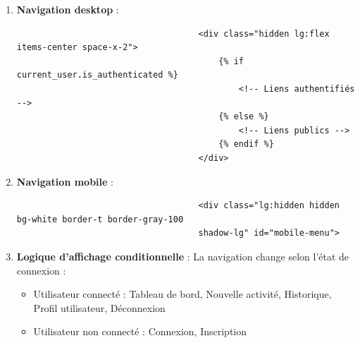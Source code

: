 \documentclass[a4paper,11pt]{article}
\begin{document}
                    \begin{enumerate}
                        \item \textbf{Navigation desktop} :
                            \begin{tcolorbox}[colback=lightgray!6, colframe=black, left=-45mm, right=5mm, top=2mm, bottom=0mm, boxrule=0.1mm]
                                \begin{verbatim}
                                    <div class="hidden lg:flex items-center space-x-2">
                                        {% if current_user.is_authenticated %}
                                            <!-- Liens authentifiés -->
                                        {% else %}
                                            <!-- Liens publics -->
                                        {% endif %}
                                    </div>
                                \end{verbatim}
                            \end{tcolorbox}

                        \item \textbf{Navigation mobile} :
                            \begin{tcolorbox}[colback=lightgray!6, colframe=black, left=-60mm, right=5mm, top=2mm, bottom=0mm, boxrule=0.1mm]
                                \begin{verbatim}
                                    <div class="lg:hidden hidden bg-white border-t border-gray-100 
                                    shadow-lg" id="mobile-menu">
                                \end{verbatim}
                            \end{tcolorbox}

                        \item \textbf{Logique d'affichage conditionnelle} :
                            \noindent La navigation change selon l'état de connexion :
                            \begin{itemize}
                                \item Utilisateur connecté : Tableau de bord, Nouvelle activité, Historique, Profil utilisateur, Déconnexion
                                \item Utilisateur non connecté : Connexion, Inscription
                            \end{itemize}


\end{enumerate}
\end{document}
